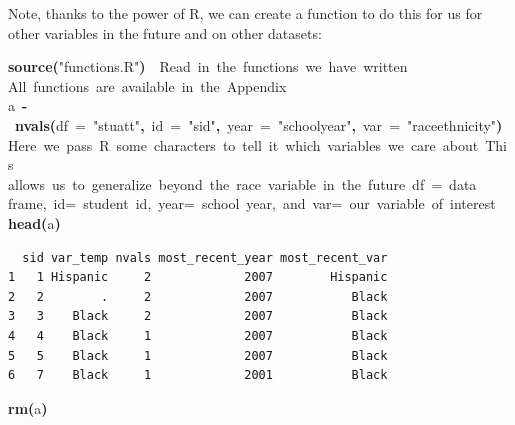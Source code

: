 \documentclass[12pt]{article}
\makeatletter
\newcommand{\hlfunctioncall}[1]{\textcolor[rgb]{0.501960784313725,0,0.329411764705882}{\textbf{#1}}}%
\newcommand{\hlstring}[1]{\textcolor[rgb]{0.6,0.6,1}{#1}}%
\newcommand{\hlkeyword}[1]{\textcolor[rgb]{0,0,0}{\textbf{#1}}}%
\newcommand{\hlargument}[1]{\textcolor[rgb]{0.690196078431373,0.250980392156863,0.0196078431372549}{#1}}%
\newcommand{\hlcomment}[1]{\textcolor[rgb]{0.180392156862745,0.6,0.341176470588235}{#1}}%
\newcommand{\hlassignement}[1]{\textcolor[rgb]{0,0,0}{\textbf{#1}}}%
\newcommand{\hlsymbol}[1]{\textcolor[rgb]{0,0,0}{#1}}%
\newcommand{\hlstd}[1]{\textcolor[rgb]{0,0,0}{#1}}%
\newenvironment{kframe}{%
 \def\FrameCommand##1{\hskip\@totalleftmargin \hskip-\fboxsep
 \colorbox{shadecolor}{##1}\hskip-\fboxsep
     \hskip-\linewidth \hskip-\@totalleftmargin \hskip\columnwidth}%
 \MakeFramed {\advance\hsize-\width
   \@totalleftmargin\z@ \linewidth\hsize
   \@setminipage}}%
 {\par\unskip\endMakeFramed}
\newenvironment{knitrout}{}{} %
\renewenvironment{knitrout}{\begin{footnotesize}}{\end{footnotesize}}
\makeatother
\begin{document}
Note, thanks to the power of R, we can create a function to do this for us for other variables in the future and on other datasets:

\begin{knitrout}
\color{fgcolor}\begin{kframe}
\begin{flushleft}
\ttfamily\noindent
\hlfunctioncall{source}\hlkeyword{(}\hlstring{"{}functions.R"{}}\hlkeyword{)}{\ }{\ }\hlcomment{\usebox{\hlnormalsizeboxhash}{\ }Read{\ }in{\ }the{\ }functions{\ }we{\ }have{\ }written}\hspace*{\fill}\\
\hlstd{}\hlcomment{\usebox{\hlnormalsizeboxhash}{\ }All{\ }functions{\ }are{\ }available{\ }in{\ }the{\ }Appendix}\hspace*{\fill}\\
\hlstd{}\hlsymbol{a}{\ }\hlassignement{\usebox{\hlnormalsizeboxlessthan}-}{\ }\hlfunctioncall{nvals}\hlkeyword{(}\hlargument{df}{\ }\hlargument{=}{\ }\hlstring{"{}stuatt"{}}\hlkeyword{,}{\ }\hlargument{id}{\ }\hlargument{=}{\ }\hlstring{"{}sid"{}}\hlkeyword{,}{\ }\hlargument{year}{\ }\hlargument{=}{\ }\hlstring{"{}school\usebox{\hlnormalsizeboxunderscore}year"{}}\hlkeyword{,}{\ }\hlargument{var}{\ }\hlargument{=}{\ }\hlstring{"{}race\usebox{\hlnormalsizeboxunderscore}ethnicity"{}}\hlkeyword{)}\hspace*{\fill}\\
\hlstd{}\hlcomment{\usebox{\hlnormalsizeboxhash}{\ }Here{\ }we{\ }pass{\ }R{\ }some{\ }characters{\ }to{\ }tell{\ }it{\ }which{\ }variables{\ }we{\ }care{\ }about{\ }This}\hspace*{\fill}\\
\hlstd{}\hlcomment{\usebox{\hlnormalsizeboxhash}{\ }allows{\ }us{\ }to{\ }generalize{\ }beyond{\ }the{\ }race{\ }variable{\ }in{\ }the{\ }future{\ }df{\ }={\ }data}\hspace*{\fill}\\
\hlstd{}\hlcomment{\usebox{\hlnormalsizeboxhash}{\ }frame,{\ }id={\ }student{\ }id,{\ }year={\ }school{\ }year,{\ }and{\ }var={\ }our{\ }variable{\ }of{\ }interest}\hspace*{\fill}\\
\hlstd{}\hlfunctioncall{head}\hlkeyword{(}\hlsymbol{a}\hlkeyword{)}\mbox{}
\normalfont
\end{flushleft}
\begin{verbatim}
  sid var_temp nvals most_recent_year most_recent_var
1   1 Hispanic     2             2007        Hispanic
2   2        .     2             2007           Black
3   3    Black     2             2007           Black
4   4    Black     1             2007           Black
5   5    Black     1             2007           Black
6   7    Black     1             2001           Black
\end{verbatim}
\begin{flushleft}
\ttfamily\noindent
\hlfunctioncall{rm}\hlkeyword{(}\hlsymbol{a}\hlkeyword{)}\mbox{}
\normalfont
\end{flushleft}
\end{kframe}
\end{knitrout}
\end{document}
